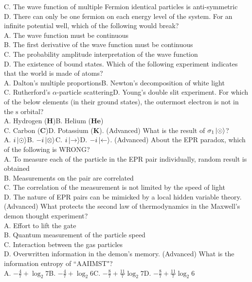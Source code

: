 \documentclass[12pt]{book} %
\numberwithin{equation}{chapter}
\def\a{\alpha}
\def\s{\sigma}
\def\mc{\hspace{0.5cm}}
\begin{document}
C. The wave function of multiple Fermion identical particles is anti-symmetric\\
D. There can only be one fermion on each energy level of the system\bigskip{}. For an infinite potential well, which of the following would break?\\
A. The wave function must be continuous\\
B. The first derivative of the wave function must be continuous\\
C. The probability amplitude interpretation of the wave function\\
D. The existence of bound states\bigskip{}. Which of the following experiment indicates that the world is made of atoms?\\
A. Dalton's multiple proportions\mc B. Newton's decomposition of white light\\
C. Rutherford's $\a$-particle scattering\mc D. Young's double slit experiment\bigskip{}. For which of the below elements (in their ground states), the outermost electron is not in the $\text{s}$ orbital?\\
A. Hydrogen ($\mathbf{H}$)\mc B. Helium ($\mathbf{He}$)\\
C. Carbon ($\mathbf{C}$)\mc D. Potassium ($\mathbf{K}$)\bigskip{}. (Advanced) What is the result of $\s_{1}\ket{\odot}$?\\
A. $i\ket{\odot}$\mc B. $-i\ket{\otimes}$\mc C. $i\ket{\rightarrow}$\mc D. $-i\ket{\leftarrow}$\bigskip{}. (Advanced) About the EPR paradox, which of the following is WRONG?\\
A. To measure each of the particle in the EPR pair individually, random result is obtained\\
B. Measurements on the pair are correlated\\
C. The correlation of the measurement is not limited by the speed of light\\
D. The nature of EPR pairs can be mimicked by a local hidden variable theory\bigskip{}. (Advanced) What protects the second law of thermodynamics in the Maxwell's demon thought experiment?\\
A. Effort to lift the gate\\
B. Quantum measurement of the particle speed\\
C. Interaction between the gas particles\\
D. Overwritten information in the demon's memory\bigskip{}. (Advanced) What is the information entropy of ``AAIIMST"?\\
A. $-\frac{4}{7}+\log_{2}7$\mc B. $-\frac{4}{7}+\log_{2}6$\mc C. $-\frac{8}{7}+\frac{11}{7}\log_{2}7$\mc D. $-\frac{8}{7}+\frac{11}{7}\log_{2}6$
\end{document}
